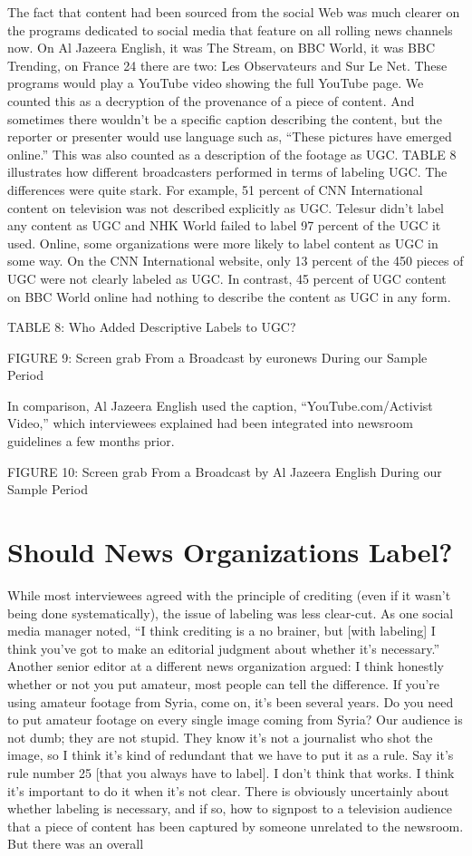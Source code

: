 \begin{enumerate}
The fact that content had been sourced from the social Web was much
clearer on the programs dedicated to social media that feature on all rolling
news channels now. On Al Jazeera English, it was The Stream, on BBC
World, it was BBC Trending, on France 24 there are two: Les Observateurs
and Sur Le Net. These programs would play a YouTube video showing the
full YouTube page. We counted this as a decryption of the provenance of
a piece of content. And sometimes there wouldn't be a specific caption
describing the content, but the reporter or presenter would use language
such as, ``These pictures have emerged online.'' This was also counted as a
description of the footage as UGC.
TABLE 8 illustrates how different broadcasters performed in terms of labeling
UGC. The differences were quite stark. For example, 51 percent of CNN
International content on television was not described explicitly as UGC.
Telesur didn't label any content as UGC and NHK World failed to label 97
percent of the UGC it used. Online, some organizations were more likely
to label content as UGC in some way. On the CNN International website,
only 13 percent of the 450 pieces of UGC were not clearly labeled as UGC.
In contrast, 45 percent of UGC content on BBC World online had nothing
to describe the content as UGC in any form.

TABLE 8: Who Added Descriptive Labels to UGC?

FIGURE 9: Screen grab From a Broadcast by euronews During our Sample Period


In comparison, Al Jazeera English used the caption, ``YouTube.com/Activist
Video,'' which interviewees explained had been integrated into newsroom
guidelines a few months prior.

FIGURE 10: Screen grab From a Broadcast by Al Jazeera English During our Sample Period
\section{Should News Organizations Label?}
While most interviewees agreed with the principle of crediting (even if it
wasn't being done systematically), the issue of labeling was less clear-cut. As
one social media manager noted, ``I think crediting is a no brainer, but [with
labeling] I think you've got to make an editorial judgment about whether it's
necessary.'' Another senior editor at a different news organization argued:
I think honestly whether or not you put amateur, most people can tell
the difference. If you're using amateur footage from Syria, come on,
it's been several years. Do you need to put amateur footage on every
single image coming from Syria? Our audience is not dumb; they
are not stupid. They know it's not a journalist who shot the image,
so I think it's kind of redundant that we have to put it as a rule. Say
it's rule number 25 [that you always have to label]. I don't think that
works. I think it's important to do it when it's not clear.
There is obviously uncertainly about whether labeling is necessary, and if
so, how to signpost to a television audience that a piece of content has been
captured by someone unrelated to the newsroom. But there was an overall


\end{enumerate}
